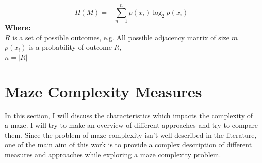 \begin{equation}
H(M) = - \sum_{n = 1}^{n} p(x_i)\log_2 p(x_i)
\end{equation}
\textbf{Where:}\\
$R$ is a set of possible outcomes, e.g.  All possible adjacency matrix of size $m$\\
$p(x_i)$ is a probability of outcome $R$,\\
$n= |R|$\\
\section{Maze Complexity Measures}
In this section, I will discuss the characteristics which impacts the complexity of a maze. I will try to make an overview of different approaches and try to compare them. Since the problem of maze complexity isn’t well described in the literature, one of the main aim of this work is to provide a complex description of different measures and approaches while exploring a maze complexity problem. 
